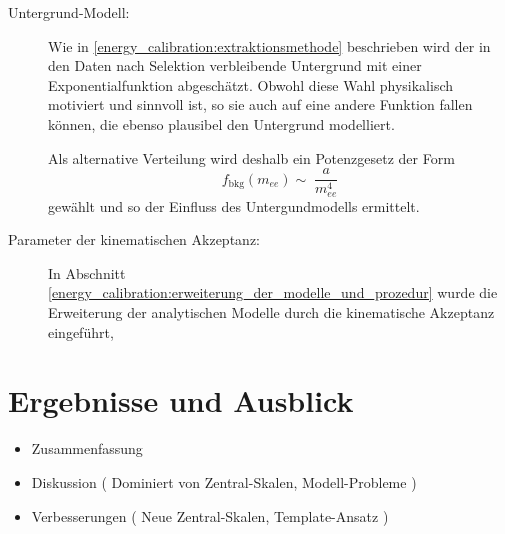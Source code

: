 \begin{description}
    \item[Untergrund-Modell:]
        Wie in \ref{energy_calibration:extraktionsmethode} beschrieben wird der
        in den Daten nach Selektion verbleibende Untergrund mit einer
        Exponentialfunktion abgeschätzt. Obwohl diese Wahl physikalisch
        motiviert und sinnvoll ist, so sie auch auf eine andere Funktion fallen
        können, die ebenso plausibel den Untergrund modelliert.

        Als alternative Verteilung wird deshalb ein Potenzgesetz der Form
        \[
            f_\text{bkg}(m_{ee}) \sim\;\frac{a}{m_{ee}^4}
        \]
        gewählt und so der Einfluss des Untergundmodells ermittelt.

    \item[Parameter der kinematischen Akzeptanz:]
        In Abschnitt
        \ref{energy_calibration:erweiterung_der_modelle_und_prozedur} wurde die
        Erweiterung der analytischen Modelle durch die kinematische Akzeptanz
        eingeführt, 

\end{description}





%
\section{Ergebnisse und Ausblick}
\label{energy_calibration:ergebnisse_und_ausblick}
\begin{itemize}
    \item Zusammenfassung
    \item Diskussion ( Dominiert von Zentral-Skalen, Modell-Probleme )
    \item Verbesserungen ( Neue Zentral-Skalen, Template-Ansatz )
\end{itemize}


